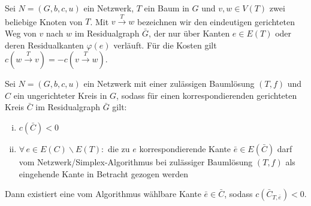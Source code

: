 \begin{nota}Sei $N=(G,b,c,u)$ ein Netzwerk, $T$ ein Baum in $G$ und $v,w\in V(T)$ zwei beliebige Knoten von $T$. Mit $v\xrightarrow{T}w$ bezeichnen wir den eindeutigen gerichteten Weg von $v$ nach $w$ im Residualgraph $\bar{G}$, der nur über Kanten $e\in E(T)$ oder deren Residualkanten $\varphi(e)$ verläuft. Für die Kosten gilt $c(w\xrightarrow{T}v) = -c(v\xrightarrow{T}w)$.\end{nota}

\begin{lem}\label{iterierbar}Sei $N=(G,b,c,u)$ ein Netzwerk mit einer zulässigen Baumlösung $(T,f)$ und $C$ ein ungerichteter Kreis in $G$, sodass für einen korrespondierenden gerichteten Kreis $\bar{C}$ im Residualgraph $\bar{G}$ gilt:
\begin{enumerate}[(i)]
	\item $c(\bar{C})<0$\label{negativ}
	\item $\forall\,e\in E(C)\backslash E(T) \colon$ die zu $e$ korrespondierende Kante $\bar{e}\in E(\bar{C})$ darf vom Netzwerk\-/Simplex-Algorithmus bei zulässiger Baumlösung $(T,f)$ als eingehende Kante in Betracht gezogen werden\label{wählbar}
\end{enumerate}
Dann existiert eine vom Algorithmus wählbare Kante $\bar{e}\in\bar{C}$, sodass $c(\bar{C}_{T,\bar{e}})<0$.
\end{lem}
